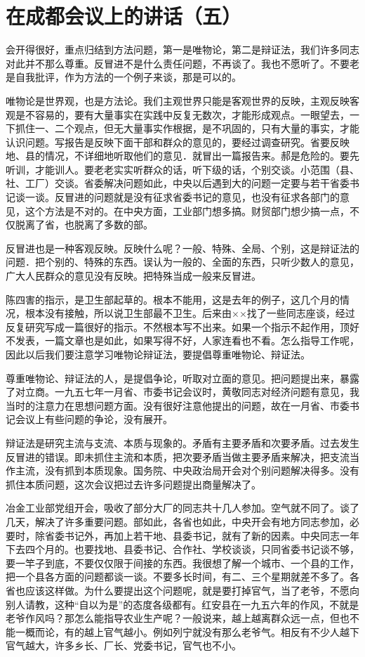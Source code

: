 \section[在成都会议上的讲话（五）（一九五九年三月二十五日）]{在成都会议上的讲话（五）}


会开得很好，重点归结到方法问题，第一是唯物论，第二是辩证法，我们许多同志对此并不那么尊重。反冒进不是什么责任问题，不再谈了。我也不愿听了。不要老是自我批评，作为方法的一个例子来谈，那是可以的。

唯物论是世界观，也是方法论。我们主观世界只能是客观世界的反映，主观反映客观是不容易的，要有大量事实在实践中反复无数次，才能形成观点。一眼望去，一下抓住一、二个观点，但无大量事实作根据，是不巩固的，只有大量的事实，才能认识问题。写报告是反映下面干部和群众的意见的，要经过调查研究。省要反映地、县的情况，不详细地听取他们的意见．就冒出一篇报告来。郝是危险的。要先听训，才能训人。要老老实实听群众的话，听下级的话，个别交谈。小范围（县、社、工厂）交谈。省委解决问题如此，中央以后遇到大的问题一定要与若干省委书记谈一谈。反冒进的问题就是没有征求省委书记的意见，也没有征求各部门的意见，这个方法是不对的。在中央方面，工业部门想多搞。财贸部门想少搞一点，不仅脱离了省，也脱离了多数的部。

反冒进也是一种客观反映。反映什么呢？一般、特殊、全局、个别，这是辩证法的问题．把个别的、特殊的东西。误认为一般的、全面的东西，只听少数人的意见，广大人民群众的意见没有反映。把特殊当成一般来反冒进。

陈四害的指示，是卫生部起草的。根本不能用，这是去年的例子，这几个月的情况，根本没有接触，所以说卫生部最不卫生。后来由××找了一些同志座谈，经过反复研究写成一篇很好的指示。不然根本写不出来。如果一个指示不起作用，顶好不发表，一篇文章也是如此，如果写得不好，人家连看也不看。怎么指导工作呢，因此以后我们要注意学习唯物论辩证法，要提倡尊重唯物论、辩证法。

尊重唯物论、辩证法的人，是提倡争论，听取对立面的意见。把问题提出来，暴露了对立商。一九五七年一月省、市委书记会议时，黄敬同志对经济问题有意见，我当时的注意力在思想问题方面。没有很好注意他提出的问题，故在一月省、市委书记会议上有些问题的争论，没有展开。

辩证法是研究主流与支流、本质与现象的。矛盾有主要矛盾和次要矛盾。过去发生反冒进的错误。即未抓住主流和本质，把次要矛盾当做主要矛盾来解决，把支流当作主流，没有抓到本质现象。国务院、中央政治局开会对个别问题解决得多。没有抓住本质问题，这次会议把过去许多问题提出商量解决了。

冶金工业部党组开会，吸收了部分大厂的同志共十几人参加。空气就不同了。谈了几天，解决了许多重要问题。部如此，各省也如此，中央开会有地方同志参加，必要时，除省委书记外，再加上若干地、县委书记，就有了新的因素。中央同志一年下去四个月的。也要找地、县委书记、合作社、学校谈谈，只同省委书记谈不够，要一竿子到底，不要仅仅限于间接的东西。我很想了解一个城市、一个县的工作，把一个县各方面的问题都谈一谈。不要多长时间，有二、三个星期就差不多了。各省也应该这样做。为什么要提出这个问题呢，就是要打掉官气，当了老爷，不愿向别人请教，这种“自以为是”的态度各级都有。红安县在一九五六年的作风，不就是老爷作风吗？那怎么能指导农业生产呢？一般说来，越上越离群众远一点，但也不能一概而论，有的越上官气越小。例如列宁就没有那么老爷气。相反有不少人越下官气越大，许多乡长、厂长、党委书记，官气也不小。

